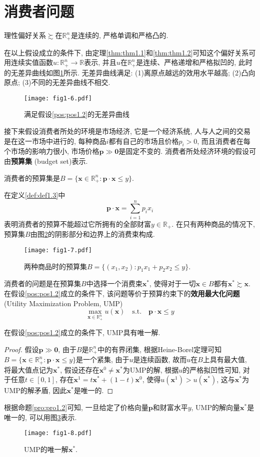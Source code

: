 \documentclass[cn, 12pt, math=mtpro2, bibstyle=apa, blue, twocol]{elegantbook}
\newcommand{\R}{\mathbb{R}}
\newcommand{\p}{\mathbf{p}}
\newcommand{\x}{\mathbf{x}}
\begin{document}
\section{消费者问题}
\begin{postulate}\label{pos:pos1.2}
理性偏好关系$\succsim$在$\R_+^n$是连续的, 严格单调和严格凸的.
\end{postulate}
在以上假设成立的条件下, 由定理\ref{thm:thm1.1}和\ref{thm:thm1.2}可知这个偏好关系可用连续实值函数$u:\R^n_+\to\R$表示, 并且$u$在$\R^n_+$是连续、严格递增和严格拟凹的, 此时的无差异曲线如图\ref{fig1.6}所示. 无差异曲线满足: (1)离原点越远的效用水平越高; (2)凸向原点; (3)不同的无差异曲线不相交.
\begin{figure}[htbp!]
  \centering
  \texttt{[image: fig1-6.pdf]}
  \caption{满足假设\ref{pos:pos1.2}的无差异曲线}\label{fig1.6}
\end{figure}

接下来假设消费者所处的环境是市场经济, 它是一个经济系统, 人与人之间的交易是在这一市场中进行的, 每种商品$i$都有自己的市场且价格$p_i>0$, 而且消费者在每个市场的影响力很小, 市场价格$\p\gg\mathbf{0}$是固定不变的. 消费者所处经济环境的假设可由\textbf{预算集} (budget set)表示.
\begin{definition}\label{def:def1.3}
消费者的预算集是$B=\{\x\in\R_+^n: \mathbf{p}\cdot\x\leq y\}$.
\end{definition}
在定义\ref{def:def1.3}中
$$\p\cdot\x=\sum_{i=1}^{n}p_ix_i$$
表明消费者的预算不能超过它所拥有的全部财富$y\in \R_+$. 在只有两种商品的情况下, 预算集$B$由图\ref{fig1.7}的阴影部分和边界上的消费束构成.
\begin{figure}[htbp!]
  \centering
  \texttt{[image: fig1-7.pdf]}
  \caption{两种商品时的预算集$B=\{(x_1,x_2): p_1x_1+p_2x_2\leq y\}$.}\label{fig1.7}
\end{figure}

消费者的问题是在预算集$B$中选择一个消费束$\x^\ast$, 使得对于一切$\x\in B$都有$\x^\ast\succsim \x$. 在假设\ref{pos:pos1.2}成立的条件下, 该问题等价于预算约束下的\textbf{效用最大化问题} (Utility Maximization Problem, UMP)
\begin{equation}\label{eq1.3}
  \max_{\x\in\R^n_+} u(\x)\quad \text{s.t.}\quad \p\cdot\x\leq y
\end{equation}
\begin{proposition}\label{pro:pro1.2}
在假设\ref{pos:pos1.2}成立的条件下, UMP具有唯一解.
\end{proposition}
\begin{proof}
  假设$\p\gg\mathbf{0}$, 由于$B$是$\R^n_+$中的有界闭集, 根据Heine-Borel定理可知$B=\{\x\in\R_+^n:\p\cdot\x\leq y\}$是一个紧集, 由于$u$是连续函数, 故而$u$在$B$上具有最大值, 将最大值点记为$\x^\ast$, 假设还存在$\x^0\neq \x^\ast$为UMP的解, 根据$u$的严格拟凹性可知, 对于任意$t\in [0,1]$, 存在$\x^1=t\x^\ast+(1-t)\x^0$, 使得$u(\x^1)>u(\x^\ast)$, 这与$\x^\ast$为UMP的解矛盾, 因此$\x^\ast$是唯一的.
\end{proof}
根据命题\ref{pro:pro1.2}可知, 一旦给定了价格向量$\p$和财富水平$y$, UMP的解向量$\x^\ast$是唯一的, 可以用图\ref{fig1.8}表示.
\begin{figure}[htbp!]
  \centering
  \texttt{[image: fig1-8.pdf]}
  \caption{UMP的唯一解$\x^\ast$.}\label{fig1.8}
\end{figure}
\end{document}
